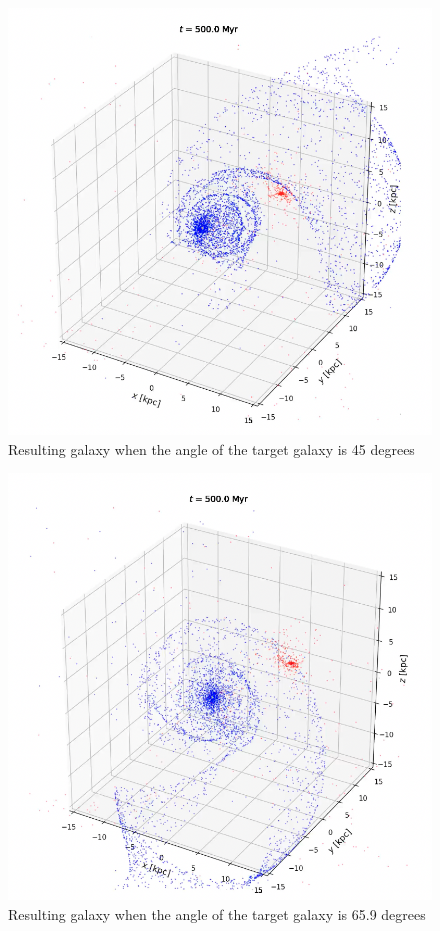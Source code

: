\documentclass[linenumbers,RNAAS,trackchanges]{aastex631}
\begin{document}
\begin{figure}[H]
    \centering
    \includegraphics[scale=.50]{vip/45angle.png}
    \caption{Resulting galaxy when the angle of the target galaxy is 45 degrees}
    \label{fig:code}
\end{figure}
\begin{figure}[H]
    \centering
    \includegraphics[scale=.50]{vip/65.9angle.png}
    \caption{Resulting galaxy when the angle of the target galaxy is 65.9 degrees}
    \label{fig:code}
\end{figure}
\end{document}
